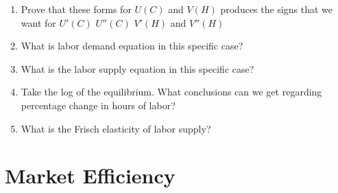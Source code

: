\documentclass[11pt]{scrartcl}
\begin{document}
\begin{enumerate}
\begin{enumerate}
\item Prove that these forms for $U(C)$ and $V(H)$ produces the signs that we want for $U'(C)$ $U''(C)$ $V'(H)$ and $V''(H)$
\item What is labor demand equation in this specific case?
\item What is the labor supply equation in this specific case?
\item Take the log of the equilibrium. What conclusions can we get regarding percentage change in hours of labor?
\item What is the Frisch elasticity of labor supply?
\end{enumerate}
\end{enumerate}

\section{Market Efficiency}
\end{document}
